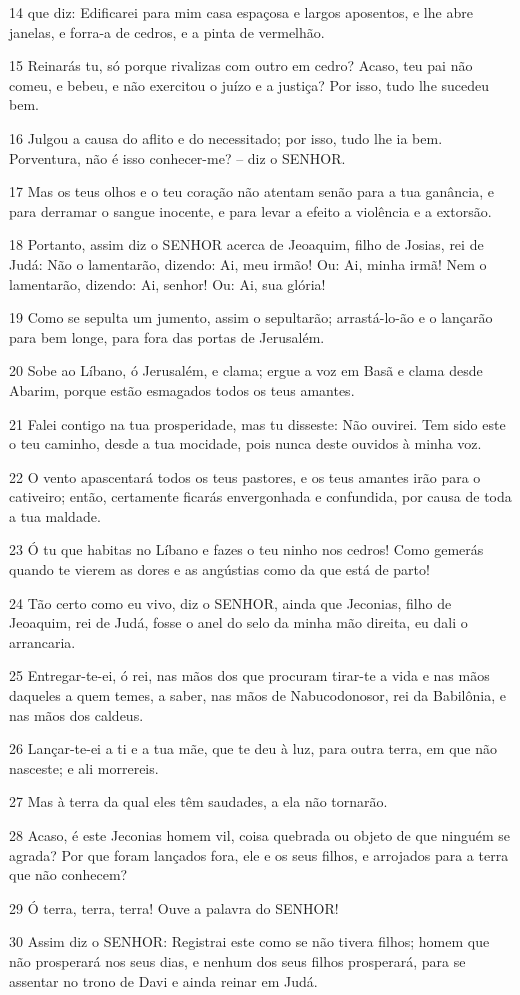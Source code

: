 \par 14 que diz: Edificarei para mim casa espaçosa e largos aposentos, e lhe abre janelas, e forra-a de cedros, e a pinta de vermelhão.
\par 15 Reinarás tu, só porque rivalizas com outro em cedro? Acaso, teu pai não comeu, e bebeu, e não exercitou o juízo e a justiça? Por isso, tudo lhe sucedeu bem.
\par 16 Julgou a causa do aflito e do necessitado; por isso, tudo lhe ia bem. Porventura, não é isso conhecer-me? -- diz o SENHOR.
\par 17 Mas os teus olhos e o teu coração não atentam senão para a tua ganância, e para derramar o sangue inocente, e para levar a efeito a violência e a extorsão.
\par 18 Portanto, assim diz o SENHOR acerca de Jeoaquim, filho de Josias, rei de Judá: Não o lamentarão, dizendo: Ai, meu irmão! Ou: Ai, minha irmã! Nem o lamentarão, dizendo: Ai, senhor! Ou: Ai, sua glória!
\par 19 Como se sepulta um jumento, assim o sepultarão; arrastá-lo-ão e o lançarão para bem longe, para fora das portas de Jerusalém.
\par 20 Sobe ao Líbano, ó Jerusalém, e clama; ergue a voz em Basã e clama desde Abarim, porque estão esmagados todos os teus amantes.
\par 21 Falei contigo na tua prosperidade, mas tu disseste: Não ouvirei. Tem sido este o teu caminho, desde a tua mocidade, pois nunca deste ouvidos à minha voz.
\par 22 O vento apascentará todos os teus pastores, e os teus amantes irão para o cativeiro; então, certamente ficarás envergonhada e confundida, por causa de toda a tua maldade.
\par 23 Ó tu que habitas no Líbano e fazes o teu ninho nos cedros! Como gemerás quando te vierem as dores e as angústias como da que está de parto!
\par 24 Tão certo como eu vivo, diz o SENHOR, ainda que Jeconias, filho de Jeoaquim, rei de Judá, fosse o anel do selo da minha mão direita, eu dali o arrancaria.
\par 25 Entregar-te-ei, ó rei, nas mãos dos que procuram tirar-te a vida e nas mãos daqueles a quem temes, a saber, nas mãos de Nabucodonosor, rei da Babilônia, e nas mãos dos caldeus.
\par 26 Lançar-te-ei a ti e a tua mãe, que te deu à luz, para outra terra, em que não nasceste; e ali morrereis.
\par 27 Mas à terra da qual eles têm saudades, a ela não tornarão.
\par 28 Acaso, é este Jeconias homem vil, coisa quebrada ou objeto de que ninguém se agrada? Por que foram lançados fora, ele e os seus filhos, e arrojados para a terra que não conhecem?
\par 29 Ó terra, terra, terra! Ouve a palavra do SENHOR!
\par 30 Assim diz o SENHOR: Registrai este como se não tivera filhos; homem que não prosperará nos seus dias, e nenhum dos seus filhos prosperará, para se assentar no trono de Davi e ainda reinar em Judá.


